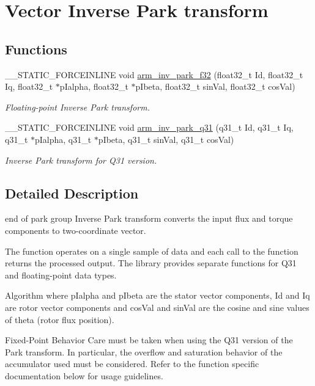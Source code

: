 \hypertarget{group__inv__park}{}\section{Vector Inverse Park transform}
\label{group__inv__park}
\subsection*{Functions}
\begin{DoxyCompactItemize}
\item 
\+\_\+\+\_\+\+S\+T\+A\+T\+I\+C\+\_\+\+F\+O\+R\+C\+E\+I\+N\+L\+I\+NE void \mbox{\hyperlink{group__inv__park_ga896b639ecd52c33d427bc7cdc8d303b2}{arm\+\_\+inv\+\_\+park\+\_\+f32}} (float32\+\_\+t Id, float32\+\_\+t Iq, float32\+\_\+t $\ast$p\+Ialpha, float32\+\_\+t $\ast$p\+Ibeta, float32\+\_\+t sin\+Val, float32\+\_\+t cos\+Val)
\begin{DoxyCompactList}\small\item\em Floating-\/point Inverse Park transform. \end{DoxyCompactList}\item 
\+\_\+\+\_\+\+S\+T\+A\+T\+I\+C\+\_\+\+F\+O\+R\+C\+E\+I\+N\+L\+I\+NE void \mbox{\hyperlink{group__inv__park_gae7165779ef72e1f797d0c601d6d619b2}{arm\+\_\+inv\+\_\+park\+\_\+q31}} (q31\+\_\+t Id, q31\+\_\+t Iq, q31\+\_\+t $\ast$p\+Ialpha, q31\+\_\+t $\ast$p\+Ibeta, q31\+\_\+t sin\+Val, q31\+\_\+t cos\+Val)
\begin{DoxyCompactList}\small\item\em Inverse Park transform for Q31 version. \end{DoxyCompactList}\end{DoxyCompactItemize}


\subsection{Detailed Description}
end of park group Inverse Park transform converts the input flux and torque components to two-\/coordinate vector.

The function operates on a single sample of data and each call to the function returns the processed output. The library provides separate functions for Q31 and floating-\/point data types. \begin{DoxyParagraph}{Algorithm}
 where {\ttfamily p\+Ialpha} and {\ttfamily p\+Ibeta} are the stator vector components, {\ttfamily Id} and {\ttfamily Iq} are rotor vector components and {\ttfamily cos\+Val} and {\ttfamily sin\+Val} are the cosine and sine values of theta (rotor flux position). 
\end{DoxyParagraph}
\begin{DoxyParagraph}{Fixed-\/\+Point Behavior}
Care must be taken when using the Q31 version of the Park transform. In particular, the overflow and saturation behavior of the accumulator used must be considered. Refer to the function specific documentation below for usage guidelines. 
\end{DoxyParagraph}


